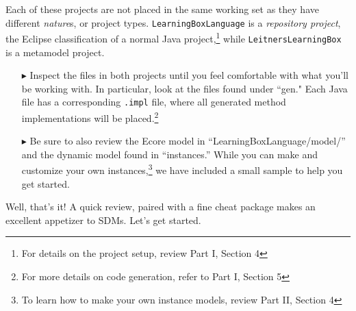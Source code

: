 Each of these projects are not placed in the same working set as they have different \emph{nature}s, or project types. \texttt{Learning\-Box\-Language} is a
\emph{repository project}, the Eclipse classification of a normal Java project,\footnote{For details on the project setup, review Part I, Section 4}
while \texttt{LeitnersLearningBox} is a metamodel project.

\begin{itemize}

\item[$\blacktriangleright$] Inspect the files in both projects until you feel comfortable with what you'll be working with. In particular, look at the files
found under ``gen." Each Java file has a corresponding \texttt{.impl} file, where all generated method implementations will be placed.\footnote{For
more details on code generation, refer to Part I, Section 5} 

\item[$\blacktriangleright$] Be sure to also review the Ecore model in ``LearningBoxLanguage/model/'' and the dynamic model found in ``instances.'' While
you can make and customize your own instances,\footnote{To learn how to make your own instance models, review Part II, Section 4} we have included a small
sample to help you get started.

\end{itemize}

Well, that's it! A quick review, paired with a fine cheat package makes an excellent appetizer to SDMs. Let's get started.